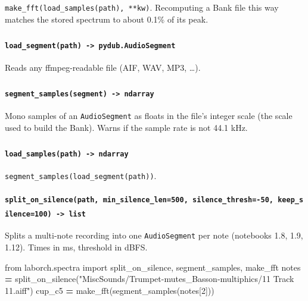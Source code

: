 \documentclass[
  10pt,
]{article}
\newenvironment{Shaded}{\begin{snugshade}}{\end{snugshade}}
\newcommand{\DecValTok}[1]{\textcolor[rgb]{0.00,0.00,0.81}{#1}}
\newcommand{\ImportTok}[1]{#1}
\newcommand{\NormalTok}[1]{#1}
\newcommand{\OperatorTok}[1]{\textcolor[rgb]{0.81,0.36,0.00}{\textbf{#1}}}
\newcommand{\StringTok}[1]{\textcolor[rgb]{0.31,0.60,0.02}{#1}}
\begin{document}
\texttt{make\_fft(load\_samples(path),\ **kw)}. Recomputing
a Bank file this way matches the stored spectrum to about
0.1\% of its peak.

\paragraph{\texorpdfstring{\texttt{load\_segment(path)\ -\textgreater{}\ pydub.AudioSegment}~\textsuperscript{\textdagger}}{load\_segment(path) -\textgreater{} pydub.AudioSegment (needs pydub)}}

Reads any ffmpeg-readable file (AIF, WAV, MP3, \ldots).

\paragraph{\texorpdfstring{\texttt{segment\_samples(segment)\ -\textgreater{}\ ndarray}~\textsuperscript{\textdagger}}{segment\_samples(segment) -\textgreater{} ndarray (needs pydub)}}

Mono samples of an \texttt{AudioSegment} as floats in the
file's integer scale (the scale used to build the Bank).
Warns if the sample rate is not 44.1 kHz.

\paragraph{\texorpdfstring{\texttt{load\_samples(path)\ -\textgreater{}\ ndarray}~\textsuperscript{\textdagger}}{load\_samples(path) -\textgreater{} ndarray (needs pydub)}}

\texttt{segment\_samples(load\_segment(path))}.

\paragraph{\texorpdfstring{\texttt{split\_on\_silence(path,\ min\_silence\_len=500,\ silence\_thresh=-50,\ keep\_silence=100)\ -\textgreater{}\ list}~\textsuperscript{\textdagger}}{split\_on\_silence(path, min\_silence\_len=500, silence\_thresh=-50, keep\_silence=100) -\textgreater{} list (needs pydub)}}

Splits a multi-note recording into one \texttt{AudioSegment}
per note (notebooks 1.8, 1.9, 1.12). Times in ms, threshold
in dBFS.

\begin{Shaded}
\begin{Highlighting}[]
\ImportTok{from}\NormalTok{ laborch.spectra }\ImportTok{import}\NormalTok{ split\_on\_silence, segment\_samples, make\_fft}
\NormalTok{notes }\OperatorTok{=}\NormalTok{ split\_on\_silence(}\StringTok{"MiscSounds/Trumpet{-}mutes\_Basson{-}multiphics/11 Track 11.aiff"}\NormalTok{)}
\NormalTok{cup\_c5 }\OperatorTok{=}\NormalTok{ make\_fft(segment\_samples(notes[}\DecValTok{2}\NormalTok{]))}
\end{Highlighting}
\end{Shaded}
\end{document}
